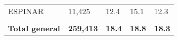 \begin{tabular}{lllll}
	\cellcolor[HTML]{FF5050}ESPINAR                                & 11,425                                                                & 12.4                                                                             & 15.1                                                                        & 12.3                                                                                \\
	&                                                                       &                                                                                  &                                                                             &                                                                                     \\
	\rowcolor[HTML]{DDEBF7} 
	\textbf{Total   general}                                       & \textbf{259,413}                                                      & \textbf{18.4}                                                                    & \textbf{18.8}                                                               & \textbf{18.3}                                                                      
\end{tabular}